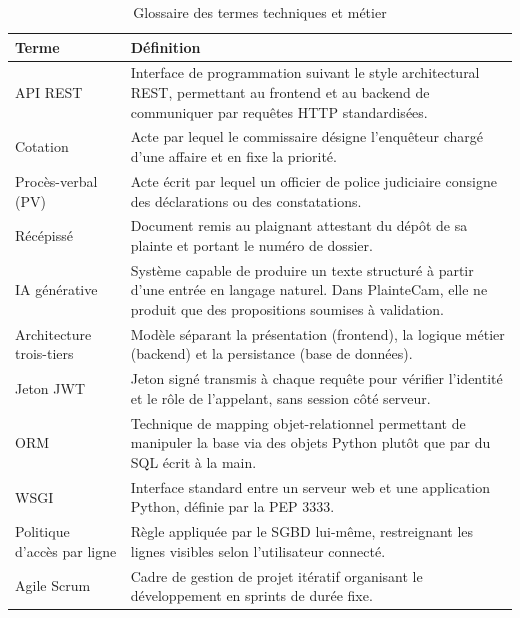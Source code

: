 \begin{table}[H]
    \centering
    \begin{tabularx}{\textwidth}{|l|X|}
        \hline
        \textbf{Terme} & \textbf{Définition} \\
        \hline
        API REST & Interface de programmation suivant le style architectural REST, permettant au frontend et au backend de communiquer par requêtes HTTP standardisées. \\
        \hline
        Cotation & Acte par lequel le commissaire désigne l'enquêteur chargé d'une affaire et en fixe la priorité. \\
        \hline
        Procès-verbal (PV) & Acte écrit par lequel un officier de police judiciaire consigne des déclarations ou des constatations. \\
        \hline
        Récépissé & Document remis au plaignant attestant du dépôt de sa plainte et portant le numéro de dossier. \\
        \hline
        IA générative & Système capable de produire un texte structuré à partir d'une entrée en langage naturel. Dans PlainteCam, elle ne produit que des propositions soumises à validation. \\
        \hline
        Architecture trois-tiers & Modèle séparant la présentation (frontend), la logique métier (backend) et la persistance (base de données). \\
        \hline
        Jeton JWT & Jeton signé transmis à chaque requête pour vérifier l'identité et le rôle de l'appelant, sans session côté serveur. \\
        \hline
        ORM & Technique de mapping objet-relationnel permettant de manipuler la base via des objets Python plutôt que par du SQL écrit à la main. \\
        \hline
        WSGI & Interface standard entre un serveur web et une application Python, définie par la PEP 3333. \\
        \hline
        Politique d'accès par ligne & Règle appliquée par le SGBD lui-même, restreignant les lignes visibles selon l'utilisateur connecté. \\
        \hline
        Agile Scrum & Cadre de gestion de projet itératif organisant le développement en sprints de durée fixe. \\
        \hline
    \end{tabularx}
    \caption{Glossaire des termes techniques et métier}
    \label{tab:glossaire}
\end{table}
